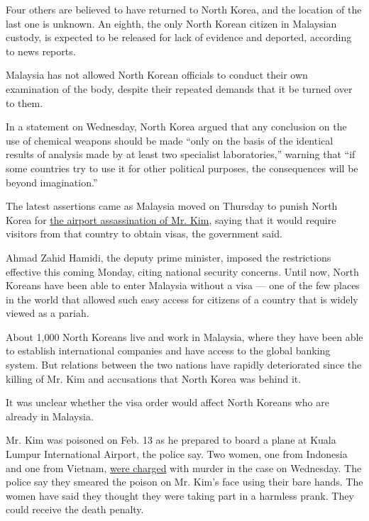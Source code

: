 Four others are believed to have returned to North Korea, and the
location of the last one is unknown. An eighth, the only North Korean
citizen in Malaysian custody, is expected to be released for lack of
evidence and deported, according to news reports.

Malaysia has not allowed North Korean officials to conduct their own
examination of the body, despite their repeated demands that it be
turned over to them.

In a statement on Wednesday, North Korea argued that any conclusion on
the use of chemical weapons should be made ``only on the basis of the
identical results of analysis made by at least two specialist
laboratories,'' warning that ``if some countries try to use it for other
political purposes, the consequences will be beyond imagination.''

The latest assertions came as Malaysia moved on Thursday to punish North
Korea for
\href{https://www.nytimes.com/2017/02/22/world/asia/kim-jong-nam-assassination-korea-malaysia.html}{the
airport assassination of Mr. Kim}, saying that it would require visitors
from that country to obtain visas, the government said.

Ahmad Zahid Hamidi, the deputy prime minister, imposed the restrictions
effective this coming Monday, citing national security concerns. Until
now, North Koreans have been able to enter Malaysia without a visa ---
one of the few places in the world that allowed such easy access for
citizens of a country that is widely viewed as a pariah.

About 1,000 North Koreans live and work in Malaysia, where they have
been able to establish international companies and have access to the
global banking system. But relations between the two nations have
rapidly deteriorated since the killing of Mr. Kim and accusations that
North Korea was behind it.

It was unclear whether the visa order would affect North Koreans who are
already in Malaysia.

Mr. Kim was poisoned on Feb. 13 as he prepared to board a plane at Kuala
Lumpur International Airport, the police say. Two women, one from
Indonesia and one from Vietnam,
\href{https://www.nytimes.com/2017/02/28/world/asia/north-korea-kim-jong-nam-death.html}{were
charged} with murder in the case on Wednesday. The police say they
smeared the poison on Mr. Kim's face using their bare hands. The women
have said they thought they were taking part in a harmless prank. They
could receive the death penalty.

